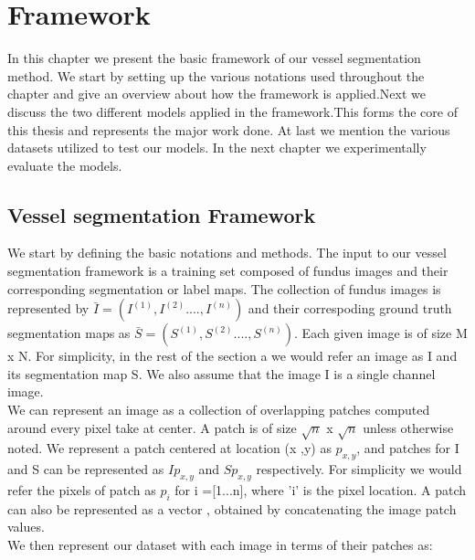 \chapter{Framework}

\ifpdf
    \graphicspath{{Chapter3/Figs/Raster/}{Chapter3/Figs/PDF/}{Chapter3/Figs/}}
\else
    \graphicspath{{Chapter3/Figs/Vector/}{Chapter3/Figs/}}
\fi
In this chapter we present the basic framework of our vessel segmentation method. We start by setting up the various notations used throughout the chapter and give an overview about how the framework is applied.Next we discuss the two different models applied in the framework.This forms the core of this thesis and represents the major work done. At last we mention the various datasets utilized to test our models. In the next chapter we experimentally evaluate the models.\\
\section{Vessel segmentation Framework}
We start by defining the basic notations and methods. The input to our vessel segmentation framework is a training set composed of fundus images and their corresponding segmentation or label maps. The collection of fundus images is represented by $\bar{I} = (I^{(1)},I^{(2)}...., I^{(n)} )$  and their correspoding ground truth segmentation maps as $\bar{S} = (S^{(1)},S^{(2)}...., S^{(n)} )$. Each given image is of size M x N.
For simplicity, in the rest of the section a we would refer an image as I and its segmentation map S. We also assume that the image I is a single channel image.\\

We can represent an image as a collection of overlapping patches computed around every pixel take at center. A patch is of size $\sqrt{n}$ x $\sqrt{n}$ unless otherwise noted. We represent a patch centered at location (x ,y) as $p_{x,y}$, and patches for I and S can be represented as $Ip_{x,y}$ and $Sp_{x,y}$ respectively. For simplicity we would refer the pixels of patch as ${p}_i$ for i =[1...n], where 'i' is the pixel location. A patch can also be represented as a vector , obtained by concatenating the image patch values.\\

We then represent our dataset with each image in terms of their patches as:

